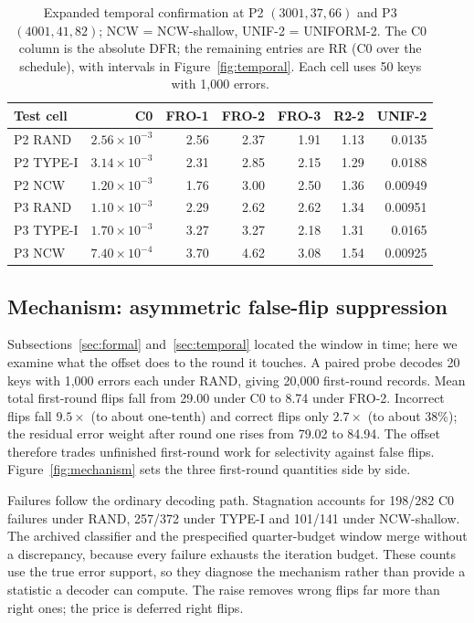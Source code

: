 \documentclass[runningheads,a4paper]{llncs}
\begin{document}
\begin{table}[!tb]
\centering
\footnotesize
\setlength{\tabcolsep}{3pt}
\caption{Expanded temporal confirmation at P2 $(3001,37,66)$ and P3 $(4001,41,82)$; NCW = NCW-shallow, UNIF-2 = UNIFORM-2. The C0 column is the absolute DFR; the remaining entries are RR (C0 over the schedule), with intervals in Figure~\ref{fig:temporal}. Each cell uses 50 keys with 1{,}000 errors.}
\label{tab:temporal}
\begin{tabular}{@{}lrrrrrr@{}}
\toprule
Test cell & C0 & FRO-1 & FRO-2 & FRO-3 & R2-2 & UNIF-2 \\
\midrule
P2 RAND & $2.56\times10^{-3}$ & 2.56 & 2.37 & 1.91 & 1.13 & 0.0135 \\
P2 TYPE-I & $3.14\times10^{-3}$ & 2.31 & 2.85 & 2.15 & 1.29 & 0.0188 \\
P2 NCW & $1.20\times10^{-3}$ & 1.76 & 3.00 & 2.50 & 1.36 & 0.00949 \\
P3 RAND & $1.10\times10^{-3}$ & 2.29 & 2.62 & 2.62 & 1.34 & 0.00951 \\
P3 TYPE-I & $1.70\times10^{-3}$ & 3.27 & 3.27 & 2.18 & 1.31 & 0.0165 \\
P3 NCW & $7.40\times10^{-4}$ & 3.70 & 4.62 & 3.08 & 1.54 & 0.00925 \\
\bottomrule
\end{tabular}
\end{table}
\subsection{Mechanism: asymmetric false-flip suppression}\label{sec:mechanism}

Subsections~\ref{sec:formal} and~\ref{sec:temporal} located the window in time; here we examine what the offset does to the round it touches. A paired probe decodes 20 keys with 1{,}000 errors each under RAND, giving 20{,}000 first-round records. Mean total first-round flips fall from 29.00 under C0 to 8.74 under FRO-2. Incorrect flips fall $9.5\times$ (to about one-tenth) and correct flips only $2.7\times$ (to about 38\%); the residual error weight after round one rises from 79.02 to 84.94. The offset therefore trades unfinished first-round work for selectivity against false flips. Figure~\ref{fig:mechanism} sets the three first-round quantities side by side.

Failures follow the ordinary decoding path. Stagnation accounts for 198/282 C0 failures under RAND, 257/372 under TYPE-I and 101/141 under NCW-shallow. The archived classifier and the prespecified quarter-budget window merge without a discrepancy, because every failure exhausts the iteration budget. These counts use the true error support, so they diagnose the mechanism rather than provide a statistic a decoder can compute. The raise removes wrong flips far more than right ones; the price is deferred right flips.
\end{document}
